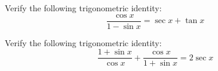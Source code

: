 \documentclass[11pt,letterpaper]{article}
\begin{document}

 Verify the following trigonometric identity: 
	\[
	\dfrac{\cos x}{1 - \sin x}= \sec x + \tan x
	\]



\newpage



 Verify the following trigonometric identity: 
	\[
	\dfrac{1 + \sin x}{\cos x} + \dfrac{\cos x}{1 + \sin x}= 2 \sec x
	\]
\end{document}
